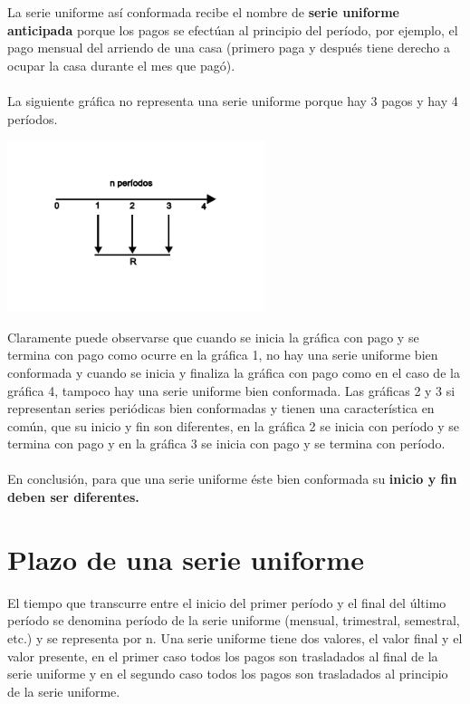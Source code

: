 	La serie uniforme así conformada recibe el nombre de \textbf{serie uniforme anticipada} porque los pagos se efectúan al principio del período, por ejemplo, el pago mensual del arriendo de una casa (primero paga y después tiene derecho a ocupar la casa durante el mes que pagó).
	\\\\
	La siguiente gráfica no representa una serie uniforme porque hay 3 pagos y hay 4 períodos.

	\begin{center}
		\includegraphics[height=5cm]{4_Capitulo/img/ejemplos/4_6.pdf}
	\end{center}

	Claramente puede observarse que cuando se inicia la gráfica con pago y se termina con pago como ocurre en la gráfica 1, no hay una serie uniforme bien conformada y cuando se inicia y finaliza la gráfica con pago como en el caso de la gráfica 4, tampoco hay una serie uniforme bien conformada. Las gráficas 2 y 3 si representan series periódicas bien conformadas y tienen una característica en común, que su inicio y fin son diferentes, en la gráfica 2 se inicia con período y se termina con pago y en la gráfica 3 se inicia con pago y se termina con período.
	\\\\
	En conclusión, para que una serie uniforme éste bien conformada su \textbf{inicio y fin deben ser diferentes.}

	\section{Plazo de una serie uniforme}
	El tiempo que transcurre entre el inicio del primer período y el final del último período se denomina período de la serie uniforme (mensual, trimestral, semestral, etc.)  y se representa por n.
	Una serie uniforme tiene dos valores, el valor final y el valor presente, en el primer caso todos los pagos son trasladados al final de la serie uniforme y en el segundo caso todos los pagos son trasladados al principio de la serie uniforme.

